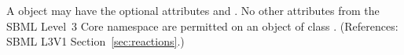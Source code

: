 A \ListOfModifierSpeciesReferences object may have the optional attributes
 and .  No other attributes from the SBML
Level~3 Core namespace are permitted on an object of class
\ListOfModifierSpeciesReferences.  (References: SBML L3V1
Section~\ref{sec:reactions}.)
